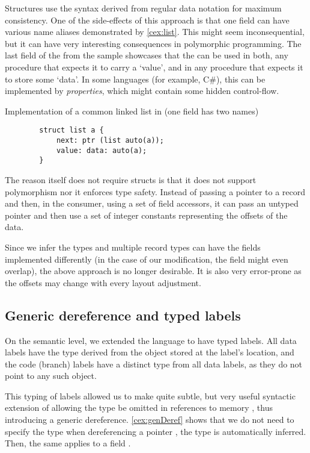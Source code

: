 Structures use the syntax derived from regular data notation for maximum consistency. One of the side-effects of this approach is that one field can have various name aliases demonstrated by \cref{cex:list}. This might seem inconsequential, but it can have very interesting consequences in polymorphic programming. The last field of the  from the sample showcases that the  can be used in both, any procedure that expects it to carry a `value', and in any procedure that expects it to store some `data'. In some languages (for example, C\#), this can be implemented by \emph{properties}, which might contain some hidden control-flow.

\begin{codex}
    \caption{Implementation of a common linked list in \cmm (one field has two names)}
    \label{cex:list}

    \begin{lstlisting}
        struct list a {
            next: ptr (list auto(a));
            value: data: auto(a);
        }
    \end{lstlisting}
\end{codex}

The reason \cmm itself does not require structs is that it does not support polymorphism nor it enforces type safety. Instead of passing a pointer to a record and then, in the consumer, using a set of field accessors, it can pass an untyped pointer and then use a set of integer constants representing the offsets of the data.

Since we infer the types and multiple record types can have the fields implemented differently (in the case of our modification, the field might even overlap), the above approach is no longer desirable. It is also very error-prone as the offsets may change with every layout adjustment.

\subsection{Generic dereference and typed labels}
\label{sec:genDerefDef}
On the semantic level, we extended the language to have typed labels. All data labels have the type derived from the object stored at the label's location, and the code (branch) labels have a distinct type from all data labels, as they do not point to any such object.

This typing of labels allowed us to make quite subtle, but very useful syntactic extension of allowing the type be omitted in references to memory \cite{ramsey2005c}, thus introducing a generic dereference. \cref{cex:genDeref} shows that we do not need to specify the type when dereferencing a pointer , the type is automatically inferred. Then, the same applies to a  field .

